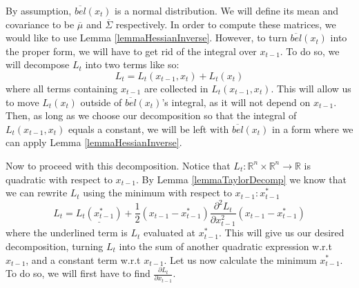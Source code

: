 By assumption, \(\overline{bel}(x_t)\) is a normal distribution. We will define its mean and covariance to be \(\overline{\mu}\) and \(\overline{\Sigma}\) respectively. In order to compute these matrices, we would like to use Lemma \ref{lemmaHessianInverse}. However, to turn \(\overline{bel}(x_t)\) into the proper form, we will have to get rid of the integral over \(x_{t-1}\). To do so, we will decompose \(L_t\) into two terms like so: \begin{equation} \label{eqLtDecomp}
L_t = L_t(x_{t-1},x_t) + L_t(x_t)
\end{equation}
where all terms containing \(x_{t-1}\) are collected in \(L_t(x_{t-1},x_t)\). This will allow us to move \(L_t(x_t)\) outside of \(\overline{bel}(x_t)\)'s integral, as it will not depend on \(x_{t-1}\). Then, as long as we choose our decomposition so that the integral of \(L_t(x_{t-1},x_t)\) equals a constant, we will be left with \(\overline{bel}(x_t)\) in a form where we can apply Lemma \ref{lemmaHessianInverse}.

Now to proceed with this decomposition. Notice that \(L_t : \mathbb{R}^n \times \mathbb{R}^n \to \mathbb{R}\) is quadratic with respect to \(x_{t-1}\). By Lemma \ref{lemmaTaylorDecomp} we know that we can rewrite \(L_t\) using the minimum with respect to \(x_{t-1}: x_{t-1}^*\) \[
L_t = \underline{L_t(x_{t-1}^*)} + \frac{1}{2} (x_{t-1} - x_{t-1}^*) \frac{\partial^2 L_t}{\partial x_{t-1}^2} (x_{t-1} - x_{t-1}^*)
\] 
where the underlined term is \(L_t\) evaluated at \(x_{t-1}^*\). This will give us our desired decomposition, turning \(L_t\) into the sum of another quadratic expression w.r.t \(x_{t-1}\), and a constant term w.r.t \(x_{t-1}\). Let us now calculate the minimum \(x_{t-1}^*\). To do so, we will first have to find \(\frac{\partial L_t}{\partial x_{t-1}}\).

